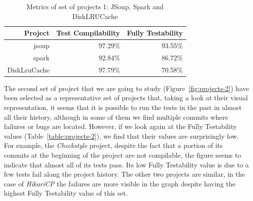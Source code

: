 \begin{figure}[!htb]
\begin{minipage}{.5\textwidth}
        \label{fig:disklrucache}
    \end{minipage}%
\end{figure}

\begin{table}[h!]
    \centering
    \begin{tabular}{|r|r|r|}
    \hline
    \textbf{Project} & \textbf{Test Compilability} & \textbf{Fully Testability} \\ \hline
    jsoup            & 97.29\%                      & 93.55\%                      \\ \hline
    spark            & 92.84\%                      & 86.72\%                      \\ \hline
    DiskLruCache     & 97.79\%                      & 70.58\%                      \\ \hline
    \end{tabular}
    \caption{Metrics of set of projects 1: JSoup, Spark and DiskLRUCache}
    \label{table:projects-1}
\end{table}


The second set of project that we are going to study (Figure~\ref{fig:projects-2}) have been selected as a representative set of projects that, taking a look at their visual representation, it seems that it is possible to run the tests in the past in almost all their history, although in some of them we find multiple commits where failures or bugs are located.
However, if we look again at the Fully Testability values (Table~\ref{table:projects-2}), we find that their values are surprisingly low. 
For example, the \textit{Checkstyle} project, despite the fact that a portion of its commits at the beginning of the project are not compilable, the figure seems to indicate that almost all of its tests pass. 
Its low Fully Testability value is due to a few tests fail along the project history.
The other two projects are similar, in the case of \textit{HikariCP} the failures are more visible in the graph despite having the highest Fully Testability value of this set.

